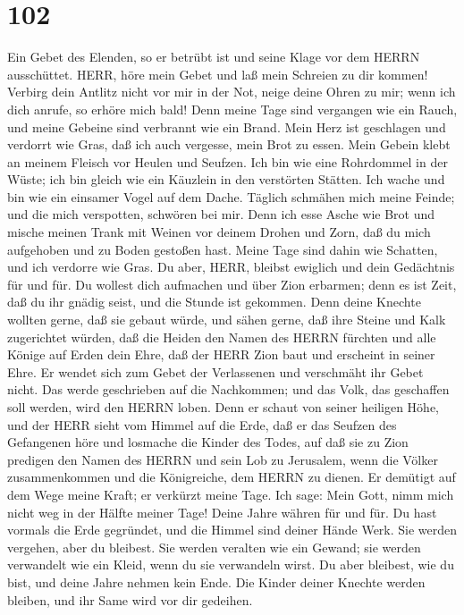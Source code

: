 \hypertarget{section-101}{%
\section{102}\label{section-101}}

 Ein Gebet des Elenden, so er betrübt ist und seine Klage
vor dem HERRN ausschüttet. HERR, höre mein Gebet und laß mein Schreien
zu dir kommen!  Verbirg dein Antlitz nicht vor mir in der
Not, neige deine Ohren zu mir; wenn ich dich anrufe, so erhöre mich
bald!  Denn meine Tage sind vergangen wie ein Rauch, und
meine Gebeine sind verbrannt wie ein Brand.  Mein Herz ist
geschlagen und verdorrt wie Gras, daß ich auch vergesse, mein Brot zu
essen.  Mein Gebein klebt an meinem Fleisch vor Heulen und
Seufzen.  Ich bin wie eine Rohrdommel in der Wüste; ich bin
gleich wie ein Käuzlein in den verstörten Stätten.  Ich
wache und bin wie ein einsamer Vogel auf dem Dache.  Täglich
schmähen mich meine Feinde; und die mich verspotten, schwören bei mir.
 Denn ich esse Asche wie Brot und mische meinen Trank mit
Weinen  vor deinem Drohen und Zorn, daß du mich aufgehoben
und zu Boden gestoßen hast.  Meine Tage sind dahin wie
Schatten, und ich verdorre wie Gras.  Du aber, HERR,
bleibst ewiglich und dein Gedächtnis für und für.  Du
wollest dich aufmachen und über Zion erbarmen; denn es ist Zeit, daß du
ihr gnädig seist, und die Stunde ist gekommen.  Denn deine
Knechte wollten gerne, daß sie gebaut würde, und sähen gerne, daß ihre
Steine und Kalk zugerichtet würden,  daß die Heiden den
Namen des HERRN fürchten und alle Könige auf Erden dein Ehre,
 daß der HERR Zion baut und erscheint in seiner Ehre.
 Er wendet sich zum Gebet der Verlassenen und verschmäht
ihr Gebet nicht.  Das werde geschrieben auf die Nachkommen;
und das Volk, das geschaffen soll werden, wird den HERRN loben.
 Denn er schaut von seiner heiligen Höhe, und der HERR
sieht vom Himmel auf die Erde,  daß er das Seufzen des
Gefangenen höre und losmache die Kinder des Todes,  auf daß
sie zu Zion predigen den Namen des HERRN und sein Lob zu Jerusalem,
 wenn die Völker zusammenkommen und die Königreiche, dem
HERRN zu dienen.  Er demütigt auf dem Wege meine Kraft; er
verkürzt meine Tage.  Ich sage: Mein Gott, nimm mich nicht
weg in der Hälfte meiner Tage! Deine Jahre währen für und für.
 Du hast vormals die Erde gegründet, und die Himmel sind
deiner Hände Werk.  Sie werden vergehen, aber du bleibest.
Sie werden veralten wie ein Gewand; sie werden verwandelt wie ein Kleid,
wenn du sie verwandeln wirst.  Du aber bleibest, wie du
bist, und deine Jahre nehmen kein Ende.  Die Kinder deiner
Knechte werden bleiben, und ihr Same wird vor dir gedeihen.

